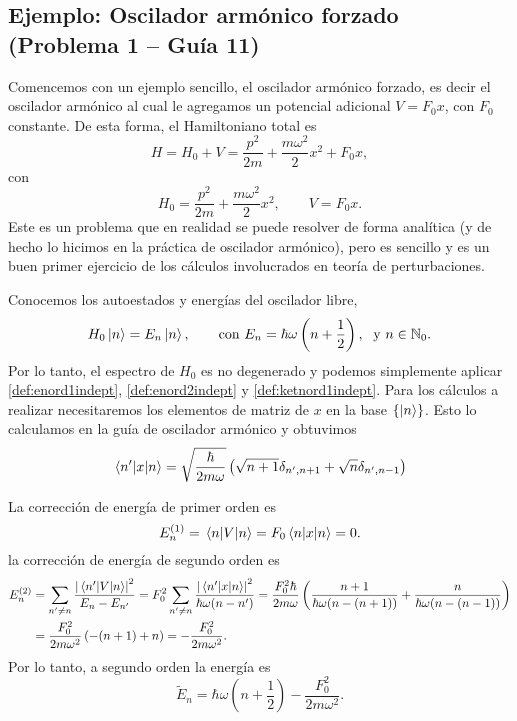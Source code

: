 \documentclass[10pt, a4paper]{article}
\numberwithin{equation}{subsection}
\begin{document}
\subsection{Ejemplo: Oscilador armónico forzado (Problema 1 -- Guía 11)}
Comencemos con un ejemplo sencillo, el oscilador armónico forzado, es decir el
oscilador armónico al cual le agregamos un potencial adicional $V = F_0x$, con
$F_0$ constante. De esta forma, el Hamiltoniano total es
\begin{equation}
  H = H_0 + V = \frac{p^2}{2m} + \frac{m\omega^2}{2}x^2 + F_0x,
\end{equation}
con
\begin{equation}
  H_0 = \frac{p^2}{2m} + \frac{m\omega^2}{2}x^2, \qquad V = F_0x.
\end{equation}
Este es un problema que en realidad se puede resolver de forma analítica (y de
hecho lo hicimos en la práctica de oscilador armónico), pero es sencillo y es
un buen primer ejercicio de los cálculos involucrados en teoría de
perturbaciones.

Conocemos los autoestados y energías del oscilador libre,
\begin{equation}
  H_0\ket{n} = E_n\ket{n}, \qquad \text{con } E_n = \hbar\omega\left(n +
  \frac{1}{2}\right), \; \text{ y } n \in \mathbb{N}_0.
\end{equation}
Por lo tanto, el espectro de $H_0$ es no degenerado y podemos simplemente
aplicar \eqref{def:enord1indept}, \eqref{def:enord2indept} y
\eqref{def:ketnord1indept}.
Para los cálculos a realizar necesitaremos los elementos de matriz de $x$ en la
base $\set{\ket{n}}$. Esto lo calculamos en la guía de oscilador armónico y
obtuvimos
\begin{equation}
  \matrixel{n'}{x}{n} = \sqrt{\frac{\hbar}{2m\omega}}\left(
    \sqrt{n+1}\delta_{n',n+1} + \sqrt{n}\delta_{n',n-1}\right)
\end{equation}

La corrección de energía de primer orden es
\begin{equation}
  E_n^{(1)} = \matrixel{n}{V}{n} = F_0\matrixel{n}{x}{n} = 0.
\end{equation}
la corrección de energía de segundo orden es
\begin{align}
  E_n^{(2)}
  &= \sum_{n' \neq n} \frac{\abs{\matrixel{n'}{V}{n}}^2}{E_n - E_{n'}}
  = F_0^2 \sum_{n' \neq n}\frac{\abs{\matrixel{n'}{x}{n}}^2}{\hbar\omega(n-n')}
  = \frac{F_0^2\hbar}{2m\omega} \left( \frac{n+1}{\hbar\omega(n - (n+1))} +
    \frac{n}{\hbar\omega(n - (n-1))} \right) \nonumber \\
  &= \frac{F_0^2}{2m\omega^2} \left( -(n+1) + n \right)
  = -\frac{F_0^2}{2m\omega^2}.
\end{align}
Por lo tanto, a segundo orden la energía es
\begin{equation}
  \tilde{E}_n = \hbar\omega\left(n + \frac{1}{2}\right) -
    \frac{F_0^2}{2m\omega^2}.
\end{equation}
\end{document}
